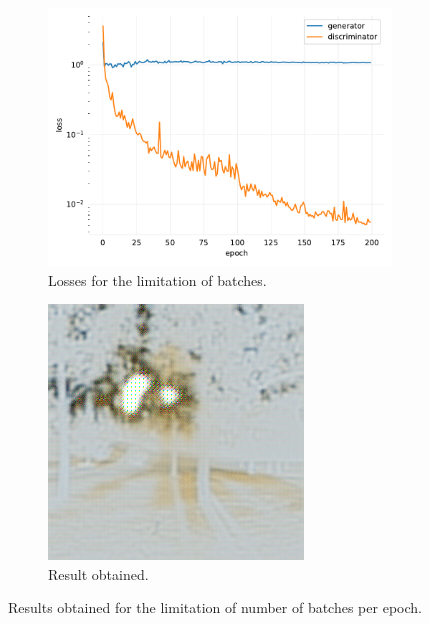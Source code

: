 \documentclass[twocolumn,superscriptaddress,aps,floatfix, nofootinbib]{revtex4-1}
\begin{document}
    \begin{figure}[H]
        \centering
        \begin{subfigure}[b]{0.22\textwidth}
            \centering
            \includegraphics[width=\textwidth]{resources/png/gan-losses/batch-limited.pdf}
            \caption{Losses for the limitation of batches.}
        \end{subfigure}
        \hfill
        \begin{subfigure}[b]{0.22\textwidth}
            \centering
            \includegraphics[width=\textwidth]{resources/png/gan-results/batch-limitation.png}
            \caption{Result obtained.}
            \label{fig:limitation}
        \end{subfigure}
        \caption{Results obtained for the limitation of number of batches per epoch.}
    \end{figure}
    
\end{document}
